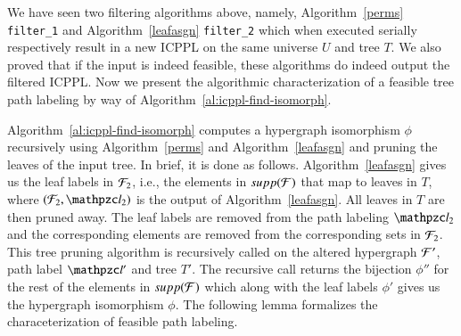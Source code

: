 \documentclass[MS,]{iitmdiss}
\begin{document}


We have seen two filtering algorithms above, namely,
Algorithm~\ref{perms} {\tt filter\_1} and Algorithm~\ref{leafasgn}
{\tt filter\_2} which when executed serially respectively result in a
new ICPPL on the same universe $U$ and tree $T$. We also proved that
if the input is indeed feasible, these algorithms do indeed output the
filtered ICPPL. Now we present the algorithmic characterization of a
feasible tree path labeling by way of Algorithm~\ref{al:icppl-find-isomorph}.

Algorithm~\ref{al:icppl-find-isomorph} computes a
hypergraph isomorphism $\phi$ recursively using Algorithm~\ref{perms}
and Algorithm~\ref{leafasgn} and pruning the leaves of the input
tree. In brief, it is done as follows. Algorithm~\ref{leafasgn} gives
us the leaf labels in ${\cal F}_2$, i.e., the elements in $supp({\cal F})$ that
map to leaves in $T$, where $(\cF_2, \cl_2)$ is the output of
Algorithm~\ref{leafasgn}. All leaves in $T$ are then pruned away. The
leaf labels are removed from the path labeling $\cl_2$ and the
corresponding elements are removed from the corresponding sets in
${\cal F}_2$. This tree pruning algorithm is recursively called on the
altered hypergraph ${\cal F}'$, path label $\cl'$ and tree $T'$. The
recursive call returns the bijection $\phi''$ for the rest of the
elements in $supp({\cal F})$ which along with the leaf labels $\phi'$ gives
us the hypergraph isomorphism $\phi$.  The following lemma formalizes
the characeterization of feasible path labeling.
\end{document}
